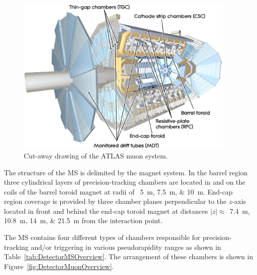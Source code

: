 \begin{figure}[htbp]
  \centering  
  \includegraphics[width=0.95\textwidth]{PartDetector/Diagrams/ATLAS_MuonSystem.eps}
  \caption{Cut-away drawing of the ATLAS muon system.}
  \label{fig:DetectorDrawingMuonSystem}
\end{figure}

The structure of the MS is delimited by the magnet system. In the barrel region three cylindrical layers of precision-tracking chambers are located in and on the coils of the barrel toroid magnet at radii of ~\SIlist{5;7.5;10}{\meter}. End-cap region coverage is provided by three chamber planes perpendicular to the $z$-axis located in front and behind the end-cap toroid magnet at distances $|z|\approx$~\SIlist{7.4;10.8;14;21.5}{\meter} from the interaction point.

The MS contains four different types of chambers responsible for precision-tracking and/or triggering in various pseudorapidity ranges as shown in Table~\ref{tab:DetectorMSOverview}. The arrangement of these chambers is shown in Figure~\ref{fig:DetectorMuonOverview}. 

